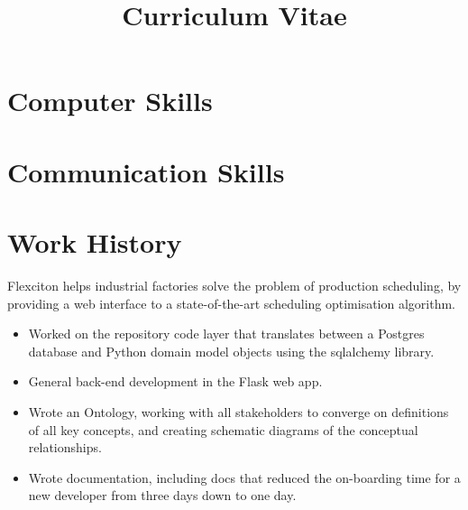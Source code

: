 \documentclass[11pt,a4paper,sans]{moderncv} %
\title{Curriculum Vitae}
\begin{document}
\makecvtitle %



\section{Computer Skills}


\section{Communication Skills}

\section{Work History}

{Flexciton helps industrial factories solve the problem of production scheduling, by providing a web interface to a state-of-the-art scheduling optimisation algorithm.
\begin{itemize}
	\item Worked on the repository code layer that translates between a Postgres database and Python domain model objects using the sqlalchemy library.
	\item General back-end development in the Flask web app.
	\item Wrote an Ontology, working with all stakeholders to converge on definitions of all key concepts, and creating schematic diagrams of the conceptual relationships.
	\item Wrote documentation, including docs that reduced the on-boarding time for a new developer from three days down to one day.
\end{itemize}}
\end{document}
